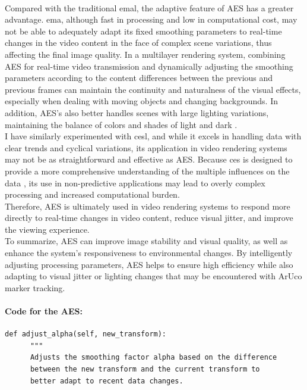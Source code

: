 \documentclass[12pt]{article}
\begin{document}
\begin{enumerate}
\begin{enumerate}
                        \\
                        Compared with the traditional \gls{emal}, the adaptive feature of AES has a greater advantage. \gls{ema}, although fast in processing and low in computational cost, may not be able to adequately adapt its fixed smoothing parameters to real-time changes in the video content in the face of complex scene variations, thus affecting the final image quality\cite{aes,aes2,InvestopediaEMA}.
                        In a multilayer rendering system, combining AES for real-time video transmission and dynamically adjusting the smoothing parameters according to the content differences between the previous and previous frames can maintain the continuity and naturalness of the visual effects, especially when dealing with moving objects and changing backgrounds. In addition, AES's also better handles scenes with large lighting variations, maintaining the balance of colors and shades of light and dark \cite{7298776}.
                        \\
                        I have similarly experimented with \gls{cesl}, and while it excels in handling data with clear trends and cyclical variations, its application in video rendering systems may not be as straightforward and effective as AES. Because \gls{ces} is designed to provide a more comprehensive understanding of the multiple influences on the data \cite{ComplexES2018,Complex}, its use in non-predictive applications may lead to overly complex processing and increased computational burden.
                        \\
                        Therefore, AES is ultimately used in video rendering systems to respond more directly to real-time changes in video content, reduce visual jitter, and improve the viewing experience.
                        \\
                        To summarize, AES can improve image stability and visual quality, as well as enhance the system's responsiveness to environmental changes. By intelligently adjusting processing parameters, AES helps to ensure high efficiency while also adapting to visual jitter or lighting changes that may be encountered with ArUco marker tracking.
                        \paragraph{Code for the AES:}
                        \begin{verbatim}
def adjust_alpha(self, new_transform):
      """
      Adjusts the smoothing factor alpha based on the difference 
      between the new transform and the current transform to 
      better adapt to recent data changes.
                                    

\end{verbatim}
\end{enumerate}
\end{enumerate}
\end{document}
